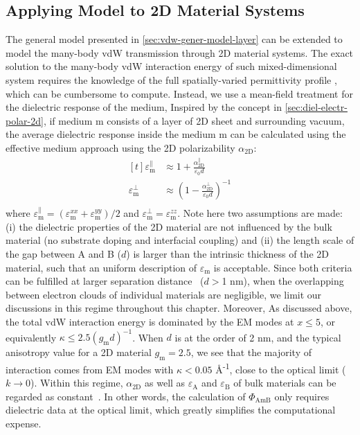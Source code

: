 \subsection{Applying Model to 2D Material Systems}
\label{sec:vdw-model-2D}

The general model presented in
\autoref{sec:vdw-gener-model-layer} can be extended to
model the many-body vdW transmission through 2D material systems.
%
The exact solution to the many-body vdW interaction energy of such
mixed-dimensional system requires the knowledge of the full
spatially-varied permittivity profile \cite{Podgornik_2004_continuum},
which can be cumbersome to compute.
%
Instead, we use a mean-field treatment for the dielectric response of
the medium, Inspired by the concept in
\autoref{sec:diel-electr-polar-2d}, if medium m consists of a layer of
2D sheet and surrounding vacuum, the average dielectric response
inside the medium m can be calculated using the effective medium
approach using the 2D polarizability $\alpha_{\mathrm{2D}}$:
\begin{equation}
  \label{eq:vdw-emt-alpha}
  \begin{aligned}[t]
    \varepsilon_{\mathrm{m}}^{\parallel} &\approx 1 + \frac{\alpha_{\mathrm{2D}}^{\parallel}}{\varepsilon_{0} d} \\
        \varepsilon_{\mathrm{m}}^{\perp} &\approx \left(1 - \frac{\alpha_{\mathrm{2D}}^{\perp}}{\varepsilon_{0} d}\right)^{-1} \\
  \end{aligned}
\end{equation}
%
where
$\varepsilon_{\mathrm{m}}^{\parallel} = (\varepsilon_{\mathrm{m}}^{xx}
+ \varepsilon_{\mathrm{m}}^{yy}) / 2$ and
$\varepsilon_{\mathrm{m}}^{\perp} = \varepsilon_{\mathrm{m}}^{zz}$.
Note here two assumptions are made: (i) the dielectric properties of
the 2D material are not influenced by the bulk material (\ie no
substrate doping and interfacial coupling) and (ii) the length scale
of the gap between A and B ($d$) is larger than the intrinsic
thickness of the 2D material, such that an uniform description of
$\varepsilon_{\mathrm{m}}$ is acceptable.
%
Since both criteria can be fulfilled at larger separation
distance~\cite{Dobson_2012_rev} (\eg $d>$1 nm), when the overlapping
between electron clouds of individual materials are negligible, we
limit our discussions in this regime throughout this chapter.
%
Moreover, As discussed above, the total vdW interaction energy is dominated by
the EM modes at $x \leq 5$, or equivalently
\(\kappa \leq 2.5 (g_{\mathrm{m}} d)^{-1}\).
%
When $d$ is at the order of 2 nm, and the typical anisotropy value for
a 2D material $g_{\mathrm{m}}=2.5$, we see that the majority of interaction comes
from EM modes with \(\kappa<0.05\) \AA{}\textsuperscript{-1}, close to the optical limit ($k\to0$).
%
Within this regime, $\alpha_{\mathrm{2D}}$ as well
as $\varepsilon_{\mathrm{A}}$ and $\varepsilon_{\mathrm{B}}$ of bulk
materials can be regarded as
constant~\cite{Li_2005_diele}.
%
In other words, the calculation of $\Phi_{\mathrm{AmB}}$ only requires
dielectric data at the optical limit, which greatly simplifies the
computational expense.

